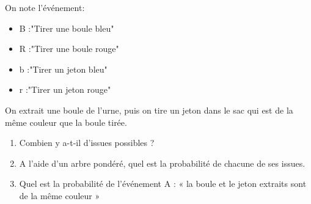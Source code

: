 \documentclass[a4paper,11pt,dvips]{article}
\begin{document}
On note l'événement:
\begin{itemize}
\item B :"Tirer une boule bleu"
\item R :"Tirer une boule rouge"
\item b :"Tirer un jeton bleu"
\item r :"Tirer un jeton rouge"\\
\end{itemize}

On extrait une boule de l'urne, puis on tire un jeton dans le sac qui est de la même couleur que la boule tirée.

\begin{enumerate}
\item Combien y a-t-il d’issues possibles ?
\item A l'aide d’un arbre pondéré, quel est la probabilité de chacune de ses issues.
\item Quel est la probabilité de l'événement A : « la boule et le jeton extraits sont de la même
couleur »
\end{enumerate}
\end{document}
